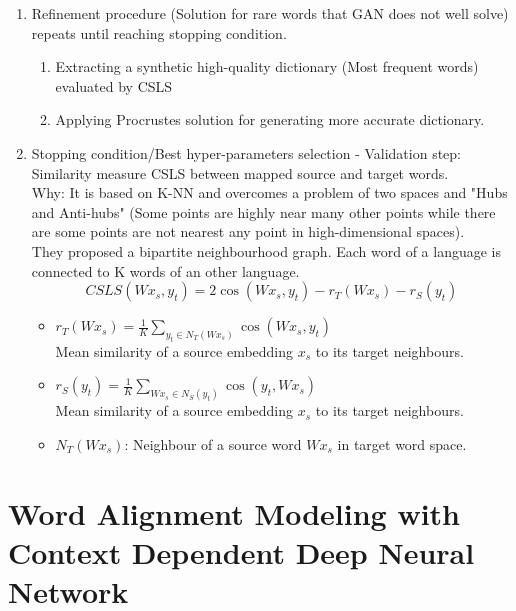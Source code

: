 \documentclass{article}
\begin{document}
\begin{enumerate}
\begin{itemize}
	
	\end{itemize}
\item Refinement procedure (Solution for rare words that GAN does not well solve) repeats until reaching stopping condition.
	\begin{enumerate}
	\item Extracting a synthetic high-quality dictionary (Most frequent words) evaluated by CSLS
	\item Applying Procrustes solution for generating more accurate dictionary.
	\end{enumerate}
\item Stopping condition/Best hyper-parameters selection - Validation step: Similarity measure CSLS between mapped source and target words.\\
	Why: It is based on K-NN and overcomes a problem of two spaces and "Hubs and Anti-hubs" (Some points are highly near many other points while there are some points are not nearest any point in high-dimensional spaces).\\
	They proposed a bipartite neighbourhood graph. Each word of a language is connected to K words of an other language.
	\begin{equation}
	CSLS(Wx_{s}, y_{t}) = 2 \cos(Wx_{s}, y_{t}) - r_{T}(Wx_{s}) - r_{S}(y_{t})
	\end{equation}
		\begin{itemize}
		\item $r_{T}(Wx_{s}) = \frac{1}{K} \sum_{y_{t} \in N_{T}(Wx_{s})} \cos(Wx_{s}, y_{t})$\\
		Mean similarity of a source embedding $x_{s}$ to its target neighbours.
		\item $r_{S}(y_{t}) = \frac{1}{K} \sum_{Wx_{s} \in N_{S}(y_{t})} \cos(y_{t}, Wx_{s})$\\
		Mean similarity of a source embedding $x_{s}$ to its target neighbours.
		\item $N_{T}(Wx_{s})$: Neighbour of a source word $Wx_{s}$ in target word space.
		\end{itemize}

\end{enumerate}


\section{Word Alignment Modeling with Context Dependent Deep Neural Network \citep{Yang13word}}
\end{document}
